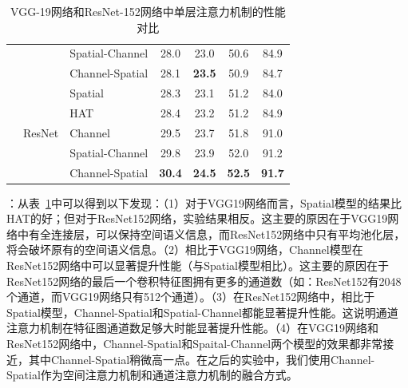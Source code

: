 \begin{table}[t]
{\begin{tabular}{|l| l |l| c c c c|}
& & Spatial-Channel &28.0 &23.0 & 50.6& 84.9\\
& & Channel-Spatial & 28.1 & \textbf{23.5} & 50.9& 84.7\\
\cline{2-7}
& \multirow{5}{*}{ResNet} & Spatial & 28.3 & 23.1 & 51.2 & 84.0 \\
&  & HAT & 28.4 & 23.2 & 51.2 & 84.9 \\
&  & Channel & 29.5 & 23.7 & 51.8 & 91.0 \\
& & Spatial-Channel &29.8 &23.9 & 52.0& 91.2\\
& & Channel-Spatial & \textbf{30.4} & \textbf{24.5} & \textbf{52.5} & \textbf{91.7}\\
\hline
\end{tabular}}
\caption{VGG-19网络和ResNet-152网络中单层注意力机制的性能对比} 
\label{ch5:tab:Q1}
\end{table}

\textbf{}：从表~\ref{ch5:tab:Q1}中可以得到以下发现：（1）对于VGG19网络而言，Spatial模型的结果比HAT的好；但对于ResNet152网络，实验结果相反。这主要的原因在于VGG19网络中有全连接层，可以保持空间语义信息，而ResNet152网络中只有平均池化层，将会破坏原有的空间语义信息。（2）相比于VGG19网络，Channel模型在ResNet152网络中可以显著提升性能（与Spatial模型相比）。这主要的原因在于ResNet152网络的最后一个卷积特征图拥有更多的通道数（如：ResNet152有2048个通道，而VGG19网络只有512个通道）。（3）在ResNet152网络中，相比于Spatial模型，Channel-Spatial和Spatial-Channel都能显著提升性能。这说明通道注意力机制在特征图通道数足够大时能显著提升性能。（4）在VGG19网络和ResNet152网络中，Channel-Spatial和Spaital-Channel两个模型的效果都非常接近，其中Channel-Spatial稍微高一点。在之后的实验中，我们使用Channel-Spatial作为空间注意力机制和通道注意力机制的融合方式。


